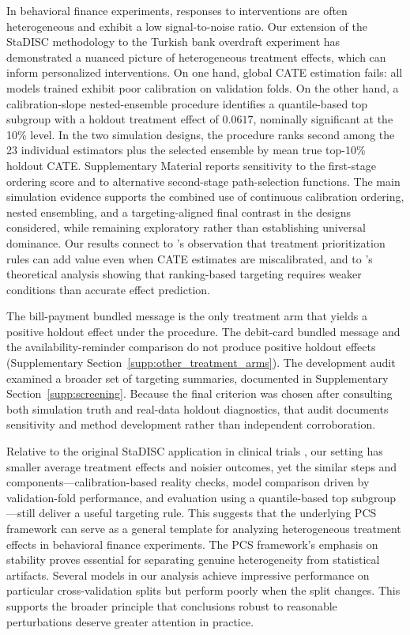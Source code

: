 \documentclass[12pt]{article}
\newcommand{\TargetFrac}{10{\%}\xspace}
\newcommand{\MainHOATE}{0.0617}
\begin{document}
In behavioral finance experiments, responses to interventions are often heterogeneous and exhibit a low signal-to-noise ratio. Our extension of the StaDISC methodology to the Turkish bank overdraft experiment has demonstrated a nuanced picture of heterogeneous treatment effects, which can inform personalized interventions. On one hand, global CATE estimation fails: all models trained exhibit poor calibration on validation folds. On the other hand, a calibration-slope nested-ensemble procedure identifies a quantile-based top subgroup with a holdout treatment effect of $\MainHOATE$, nominally significant at the 10{\%} level. In the two simulation designs, the procedure ranks second among the 23 individual estimators plus the selected ensemble by mean true top-\TargetFrac holdout CATE. Supplementary Material reports sensitivity to the first-stage ordering score and to alternative second-stage path-selection functions. The main simulation evidence supports the combined use of continuous calibration ordering, nested ensembling, and a targeting-aligned final contrast in the designs considered, while remaining exploratory rather than establishing universal dominance. Our results connect to \citet{yadlowsky2025}'s observation that treatment prioritization rules can add value even when CATE estimates are miscalibrated, and to \citet{fernandez2022}'s theoretical analysis showing that ranking-based targeting requires weaker conditions than accurate effect prediction.

The bill-payment bundled message is the only treatment arm that yields a positive holdout effect under the procedure. The debit-card bundled message and the availability-reminder comparison do not produce positive holdout effects (Supplementary Section~\ref{supp:other_treatment_arms}).
The development audit examined a broader set of targeting summaries, documented in Supplementary Section~\ref{supp:screening}. Because the final criterion was chosen after consulting both simulation truth and real-data holdout diagnostics, that audit documents sensitivity and method development rather than independent corroboration.

Relative to the original StaDISC application in clinical trials \citep{dwivedi2020}, our setting has smaller average treatment effects and noisier outcomes, yet the similar steps and components---calibration-based reality checks, model comparison driven by validation-fold performance, and evaluation using a quantile-based top subgroup---still deliver a useful targeting rule. This suggests that the underlying PCS framework can serve as a general template for analyzing heterogeneous treatment effects in behavioral finance experiments. The PCS framework's emphasis on stability proves essential for separating genuine heterogeneity from statistical artifacts. Several models in our analysis achieve impressive performance on particular cross-validation splits but perform poorly when the split changes. This supports the broader principle that conclusions robust to reasonable perturbations deserve greater attention in practice.
\end{document}
